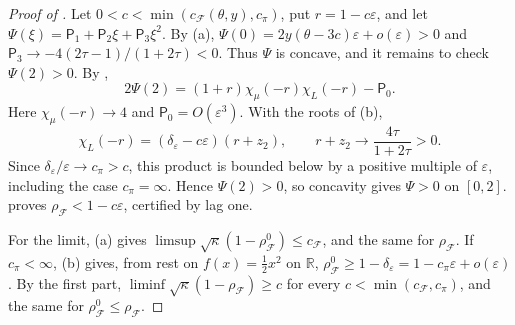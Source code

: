 \documentclass[11pt]{article}
\theoremstyle{definition}
\theoremstyle{remark}
\newcommand{\R}{\mathbb R}
\newcommand{\cF}{\mathcal F}
\newcommand{\sfP}{\mathsf P}
\newcommand{\rhoF}{\rho_{\cF}}
\newcommand{\rhoz}{\rho_{\cF}^{0}}
\newcommand{\cFF}{c_{\cF}}
\newcommand{\cpi}{c_{\pi}}
\begin{document}
\begin{proof}[Proof of ]
Let \(0<c<\min(\cFF(\theta,y),\cpi)\), put
\(r=1-c\varepsilon\), and let
\(\Psi(\xi)=\sfP_1+\sfP_2\xi+\sfP_3\xi^2\).
By (a),
\(\Psi(0)=2y(\theta-3c)\varepsilon+o(\varepsilon)>0\)
and
\(\sfP_3\to-4(2\tau-1)/(1+2\tau)<0\).
Thus \(\Psi\) is concave, and it remains to check \(\Psi(2)>0\).
By ,
\[
2\Psi(2)=(1+r)\chi_\mu(-r)\chi_L(-r)-\sfP_0.
\]
Here \(\chi_\mu(-r)\to4\) and \(\sfP_0=O(\varepsilon^3)\).
With the roots of (b),
\[
\chi_L(-r)=(\delta_\varepsilon-c\varepsilon)(r+z_2),
\qquad r+z_2\to\frac{4\tau}{1+2\tau}>0.
\]
Since \(\delta_\varepsilon/\varepsilon\to\cpi>c\), this product is
bounded below by a positive multiple of \(\varepsilon\), including
the case \(\cpi=\infty\).  Hence \(\Psi(2)>0\), so concavity gives
\(\Psi>0\) on \([0,2]\).   proves
\(\rhoF<1-c\varepsilon\), certified by lag one.

For the limit, (a) gives
\(\limsup\sqrt\kappa(1-\rhoz)\le\cFF\), and the same for \(\rhoF\).  If \(\cpi<\infty\), (b) gives, from rest on \(f(x)=\frac12x^2\) on \(\R\),
\(\rhoz\ge1-\delta_\varepsilon=1-\cpi\varepsilon+o(\varepsilon)\).  By the first part, \(\liminf\sqrt\kappa(1-\rhoF)\ge c\) for every \(c<\min(\cFF,\cpi)\), and the
same for \(\rhoz\le\rhoF\).
\end{proof}
\end{document}

